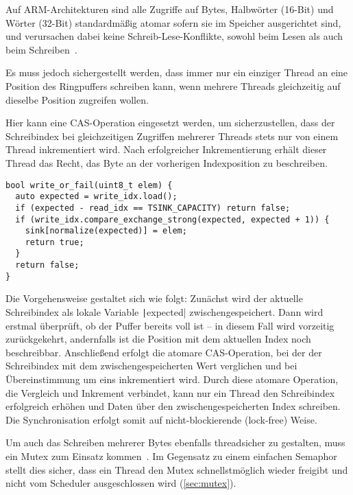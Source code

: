 Auf ARM-Architekturen sind alle Zugriffe auf Bytes, Halbwörter (16-Bit) und
Wörter (32-Bit) standardmäßig atomar sofern sie im Speicher ausgerichtet sind,
und verursachen dabei keine Schreib-Lese-Konflikte, sowohl beim Lesen als auch
beim Schreiben~\cite[S. A3-79]{ARM_DDI0403_EE}.

Es muss jedoch sichergestellt werden, dass immer nur ein einziger Thread
an eine Position des Ringpuffers schreiben kann, wenn mehrere
Threads gleichzeitig auf dieselbe Position zugreifen wollen.

Hier kann eine \ac{CAS}-Operation eingesetzt werden, um sicherzustellen, dass
der Schreibindex bei gleichzeitigen Zugriffen mehrerer Threads stets nur von
einem Thread inkrementiert wird. Nach erfolgreicher Inkrementierung erhält
dieser Thread das Recht, das Byte an der vorherigen Indexposition zu
beschreiben.

\begin{code}
\begin{verbatim}
bool write_or_fail(uint8_t elem) {
  auto expected = write_idx.load();
  if (expected - read_idx == TSINK_CAPACITY) return false;
  if (write_idx.compare_exchange_strong(expected, expected + 1)) {
    sink[normalize(expected)] = elem;
    return true;
  }
  return false;
}
\end{verbatim}
\end{code}

Die Vorgehensweise gestaltet sich wie folgt: Zunächst wird der aktuelle
Schreibindex als lokale Variable \texttt|expected| zwischengespeichert.
Dann wird erstmal überprüft, ob der Puffer bereits voll ist -- in diesem Fall
wird vorzeitig zurückgekehrt, andernfalls ist die Position mit dem aktuellen
Index noch beschreibbar. Anschließend erfolgt die atomare CAS-Operation, bei der
der Schreibindex mit dem zwischengespeicherten Wert verglichen und bei
Übereinstimmung um eins inkrementiert wird. Durch diese atomare Operation, die
Vergleich und Inkrement verbindet, kann nur ein Thread den Schreibindex
erfolgreich erhöhen und Daten über den zwischengespeicherten Index schreiben.
Die Synchronisation erfolgt somit auf nicht-blockierende (lock-free) Weise.

Um auch das Schreiben mehrerer Bytes ebenfalls threadsicher zu gestalten, muss
ein Mutex zum Einsatz kommen~\cite{FreeRTOSForumPrintf}. Im Gegensatz zu einem
einfachen Semaphor stellt dies sicher, dass ein Thread den Mutex
schnellstmöglich wieder freigibt und nicht vom Scheduler ausgeschlossen wird
(\ref{sec:mutex}).

